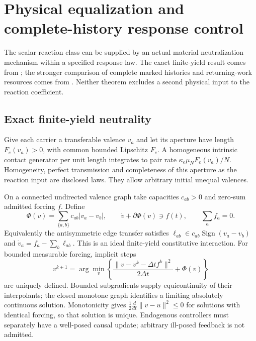 \documentclass[11pt,oneside,openany]{book}
\theoremstyle{definition}
\theoremstyle{remark}\newtheorem{remark}[theorem]{Remark}
\begin{document}
\chapter{Physical equalization and complete-history response control}
\label{kin:neutrality}

The scalar reaction class can be supplied by an actual material
neutralization mechanism within a specified response law. The exact
finite-yield result comes from \cite{M03}; the stronger comparison of
complete marked histories and returning-work resources comes from
\cite{M21}. Neither theorem excludes a second physical input to the
reaction coefficient.

\section{Exact finite-yield neutrality}
Give each carrier a transferable valence $v_a$ and let its aperture have
length $F_e(v_a)>0$, with common bounded Lipschitz $F_e$. A homogeneous
intrinsic contact generator per unit length integrates to pair rate
$\kappa_e\mu_NF_e(v_a)/N$. Homogeneity, perfect transmission and
completeness of this aperture as the reaction input are disclosed laws.
They allow arbitrary initial unequal valences.

On a connected undirected valence graph take capacities $c_{ab}>0$ and
zero-sum admitted forcing $f$. Define
\begin{equation}
 \Phi(v)=\sum_{\{a,b\}}c_{ab}|v_a-v_b|,\qquad
 \dot v+\partial\Phi(v)\ni f(t),\qquad \sum_af_a=0.
 \label{kin:yield}
\end{equation}
Equivalently the antisymmetric edge transfer satisfies
$\ell_{ab}\in c_{ab}\operatorname{Sign}(v_a-v_b)$ and
$\dot v_a=f_a-\sum_b\ell_{ab}$. This is an ideal finite-yield constitutive
interaction. For bounded measurable forcing, implicit steps
\[
 v^{k+1}=\arg\min_v\left\{
 \frac{\|v-v^k-\Delta t f^k\|^2}{2\Delta t}+\Phi(v)\right\}
\]
are uniquely defined. Bounded subgradients supply equicontinuity of their
interpolants; the closed monotone graph identifies a limiting absolutely
continuous solution. Monotonicity gives
$\frac12\frac d{dt}\|v-u\|^2\le0$ for solutions with identical forcing,
so that solution is unique. Endogenous controllers must separately have a
well-posed causal update; arbitrary ill-posed feedback is not admitted.
\end{document}
